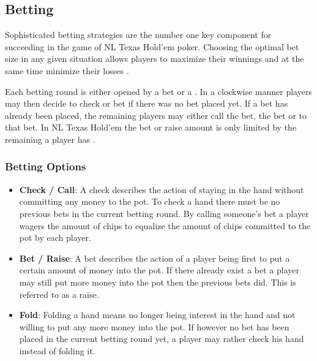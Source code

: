 \subsection{Betting}
Sophisticated betting strategies are the number one key component for succeeding in the game of NL Texas Hold'em poker. Choosing the optimal bet size in any given situation allows players to maximize their winnings and at the same time minimize their losses \cite{master_nuno}. \par
Each betting round is either opened by a bet or a . In a clockwise manner players may then decide to check or bet if there was no bet placed yet. If a bet has already been placed, the remaining players may either call the bet,  the bet or  to that bet. In NL Texas Hold'em the bet or raise amount is only limited by the remaining  a player has \cite{poker_dummies}. \par
\subsubsection{Betting Options}
\begin{itemize}
\item \textbf{Check / Call}:
A check describes the action of staying in the hand without committing any money to the pot. To check a hand there must be no previous bets in the current betting round. By calling someone's bet a player wagers the amount of chips to equalize the amount of chips committed to the pot by each player.\\ 
\item \textbf{Bet / Raise}:
A bet describes the action of a player being first to put a certain amount of money into the pot. If there already exist a bet a player may still put more money into the pot then the previous bets did. This is referred to as a raise. \\ 
\item \textbf{Fold}:
Folding a hand means no longer being interest in the hand and not willing to put any more money into the pot. If however no bet has been placed in the current betting round yet, a player may rather check his hand instead of folding it.
\end{itemize}
\cite{review, poker_dummies} 
